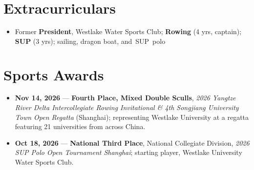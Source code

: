 \documentclass[10pt]{article}
\begin{document}
\section*{Extracurriculars}
\begin{itemize}
    \item Former \textbf{President}, Westlake Water Sports Club; \textbf{Rowing} (4 yrs, captain); \textbf{SUP} (3 yrs); sailing, dragon boat, and~SUP~polo
\end{itemize}

\section*{Sports Awards}
\begin{itemize}
    \item \textbf{Nov 14, 2026} --- \textbf{Fourth Place, Mixed Double Sculls}, \textit{2026 Yangtze River Delta Intercollegiate Rowing Invitational \& 4th Songjiang University Town Open Regatta} (Shanghai); representing Westlake University at a regatta featuring 21 universities from across China.
    \item \textbf{Oct 18, 2026} --- \textbf{National Third Place}, National Collegiate Division, \textit{2026 SUP Polo Open Tournament Shanghai}; starting player, Westlake University Water Sports Club.
\end{itemize}
\end{document}

